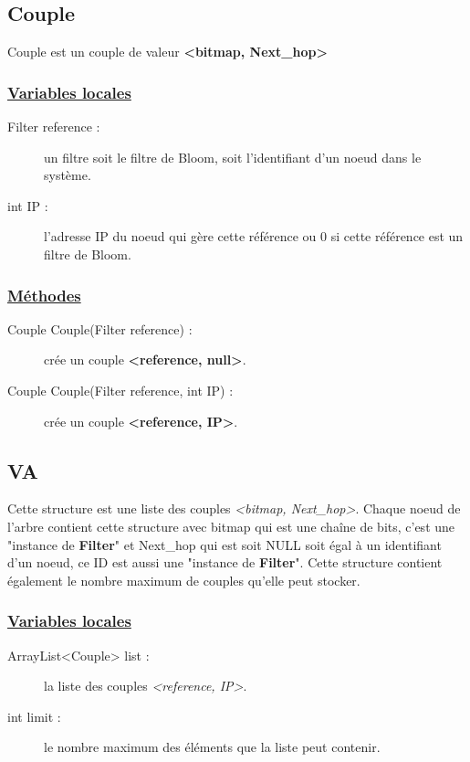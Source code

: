 \documentclass[a4paper,11pt]{report}
\begin{document}
\subsection{Couple}
	Couple est un couple de valeur \textbf{<bitmap, Next\_hop>}	

\subsubsection{\underline{Variables locales}}
	\begin{description}
		\item[Filter reference :] un filtre soit le filtre de Bloom, soit l'identifiant d'un noeud dans le système.
		\item[int IP :] l'adresse IP du noeud qui gère cette référence ou 0 si cette référence est un filtre de Bloom.
	\end{description}
	
\subsubsection{\underline{Méthodes}}
	\begin{description}
		\item[Couple Couple(Filter reference) :] crée un couple \textbf{<reference, null>}.
		\item[Couple Couple(Filter reference, int IP) :] crée un couple \textbf{<reference, IP>}.
	\end{description}
	
\subsection{VA}
	Cette structure est une liste des couples \textit{<bitmap, Next\_hop>}. Chaque noeud de l'arbre contient cette structure avec bitmap qui est une chaîne de bits, c'est une "instance de \textbf{Filter}" et Next\_hop qui est soit NULL soit égal à un identifiant d'un noeud, ce ID est aussi une "instance de \textbf{Filter}". Cette structure contient également le nombre maximum de couples qu'elle peut stocker. 
	
\subsubsection{\underline{Variables locales}}
	\begin{description}
		\item[ArrayList<Couple> list :] la liste des couples \textit{<reference, IP>}.
		\item[int limit :] le nombre maximum des éléments que la liste peut contenir.
	\end{description}
	
\end{document}
